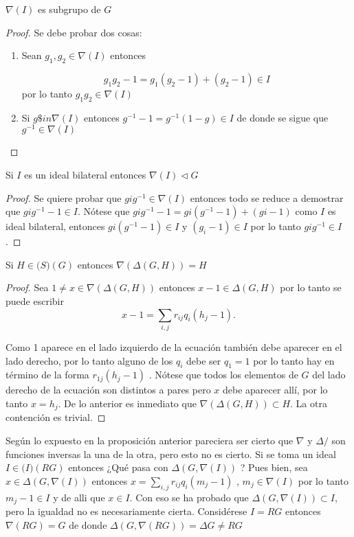 \begin{lema}
$\nabla(I)$ es subgrupo de $G$
\end{lema}
\begin{proof}
Se debe probar dos cosas:
\begin{enumerate}
\item Sean $g_1,g_2 \in \nabla(I)$ entonces 

\[g_1g_2 -1 = g_1(g_2-1) + (g_2-1) \in I \]
por lo tanto $g_1g_2 \in \nabla(I)$

\item Si $g \$in \nabla(I)$ entonces $g^{-1} -1 = g^{-1}(1-g) \in I$ de donde se sigue que $g^{-1} \in \nabla(I)$ \qedhere
\end{enumerate}
\end{proof}

\begin{lema}
Si $I$ es un ideal bilateral entonces $\nabla(I) \lhd G$
\end{lema}

\begin{proof}
Se quiere probar que $gig^{-1} \in \nabla(I)$ entonces todo se reduce a demostrar que $gig^{-1} -1 \in I$. Nótese que $gig^{-1}-1 = gi(g^{-1}-1)+(gi-1) $ como $I$ es ideal bilateral, entonces $gi(g^{-1}-1) \in I$ y $(g_i-1) \in I$  por lo tanto $gig^{-1} \in I$. \qedhere
\end{proof}


\begin{proposicion}
Si $H \in \mathcal(S)(G)$ entonces $\nabla(\Delta(G,H)) = H$ 
\end{proposicion}

\begin{proof}

Sea $1 \neq x \in \nabla(\Delta(G,H))$ entonces $x-1 \in \Delta(G,H)$ por lo tanto se puede escribir 
$$x-1 = \sum_{i,j}r_{ij}q_i(h_j-1).$$

Como 1 aparece en el lado izquierdo de la ecuación también debe aparecer en el lado derecho, por lo tanto alguno de los $q_i$ debe ser $q_1=1$ por lo tanto hay en término de la forma $r_{1j}(h_j-1)$ . Nótese que todos los elementos de $G$ del lado derecho de la ecuación son distintos a pares pero $x$ debe aparecer allí, por lo tanto $x = h_j$. De lo anterior es inmediato que $\nabla(\Delta(G,H)) \subset H$. La otra contención es trivial. \qedhere
\end{proof}

Según lo expuesto en la proposición anterior pareciera ser cierto que $\nabla$ y $\Delta/$ son funciones inversas la una de la otra, pero esto no es cierto. 
Si se toma un ideal $I \in \mathcal(I)(RG)$ entonces ¿Qué pasa con $\Delta(G,\nabla(I))$ ? Pues bien, sea $x \in \Delta(G, \nabla (I))$ entonces $x = \sum_{i,j} r_{ij}q_i(m_j-1)$ , $m_j \in \nabla(I)$ por lo tanto $m_j -1\in I$ y de alli que $x \in I$. Con eso se ha probado que $\Delta(G,\nabla(I)) \subset I$, pero la igualdad no es necesariamente cierta. Considérese $I=RG$ entonces $\nabla(RG) = G$ de donde $\Delta (G,\nabla(RG)) = \Delta G \neq RG $



